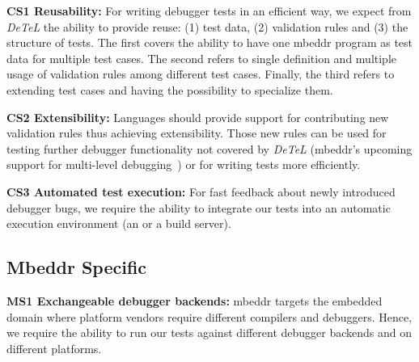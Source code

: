 \textbf{\label{CS1}CS1 Reusability:} For writing debugger tests in
an efficient way, we expect from \emph{DeTeL} the ability to provide reuse: (1)
test data, (2) validation rules and (3) the structure of tests. The first covers
the ability to have one mbeddr program as test data for multiple test cases.
The second refers to single definition and multiple usage of validation rules
among different test cases. Finally, the third refers to extending test cases
and having the possibility to specialize them.

\textbf{\label{CS2}CS2 Extensibility:} Languages should provide support for contributing new
validation rules thus achieving extensibility. Those new rules can be used for
testing further debugger functionality not covered by \emph{DeTeL} (\eg mbeddr's
upcoming support for multi-level debugging~\cite{MultiLevelDebugging:WSRE:breakedForInlining}) 
or for writing tests more efficiently.


\textbf{\label{CS3}CS3 Automated test execution:} For fast
feedback about newly introduced debugger bugs, 
we require the ability to integrate our 
tests into an automatic execution environment (\eg an  or a build
server).

\subsection{Mbeddr Specific}

\textbf{\label{MS1}MS1 Exchangeable debugger backends:} mbeddr targets the
embedded domain where platform vendors require different compilers and debuggers. 
Hence, we require the ability to run our tests against
different debugger backends and on different platforms. 
